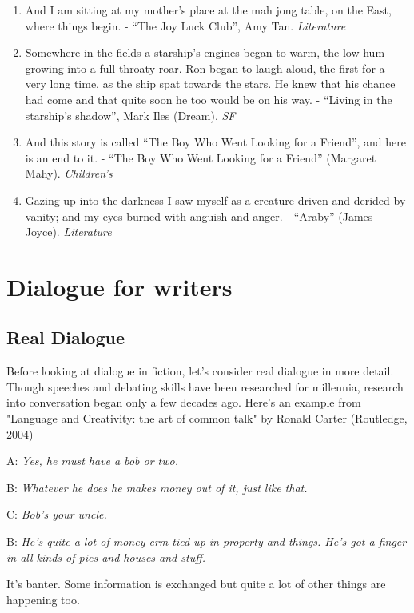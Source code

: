\documentclass[11pt]{article}
\newenvironment{narrow}[2]{%
 \begin{list}{}{%
  \setlength{\topsep}{0pt}%
  \setlength{\leftmargin}{#1}%
  \setlength{\rightmargin}{#2}%
  \setlength{\listparindent}{\parindent}%
  \setlength{\itemindent}{\parindent}%
  \setlength{\parsep}{\parskip}%
 }%
\item[]}{\end{list}}
\begin{document}
\begin{enumerate}
\item And I am sitting at my mother's place at the mah jong table, on the East,
where things begin. - ``The Joy Luck Club'', Amy Tan. \textit{Literature}


\item Somewhere in the fields a starship's engines began to warm, the low hum
growing into a full throaty roar. Ron began to laugh aloud, the first for a
very long time, as the ship spat towards the stars. He knew that his chance
had come and that quite soon he too would be on his way. - ``Living in the starship's shadow'', Mark Iles (Dream). \textit{SF}

\item And this story is called ``The Boy Who Went Looking for a Friend'', and here
is an end to it. - ``The Boy Who Went Looking for a Friend'' (Margaret Mahy). \textit{Children's} 
\item Gazing up into the darkness I saw myself as a creature driven and derided by vanity; and my eyes burned with anguish and anger. - ``Araby'' (James Joyce).  \textit{Literature}
\end{enumerate}



\newpage
\section{Dialogue for writers }
\subsection*{Real Dialogue}
Before looking at dialogue in fiction, let's consider real dialogue in more detail. Though speeches and debating skills have been researched for millennia, research into conversation began only a few decades  ago. Here's an example from "Language and Creativity: the art of common talk" by Ronald Carter (Routledge, 2004)

\begin{narrow}{1.0cm}{1.0cm}
A: \textit{Yes, he must have a bob or two.}

B:  \textit{Whatever he does he makes money out of it, just like that.}

C:  \textit{Bob's your uncle.}

B:  \textit{He's quite a lot of money erm tied up in property and things. 
   He's got a finger in all kinds of pies and houses and stuff.}
\end{narrow}
It's banter. Some information is exchanged but quite a lot of other things are happening too.
\end{document}
